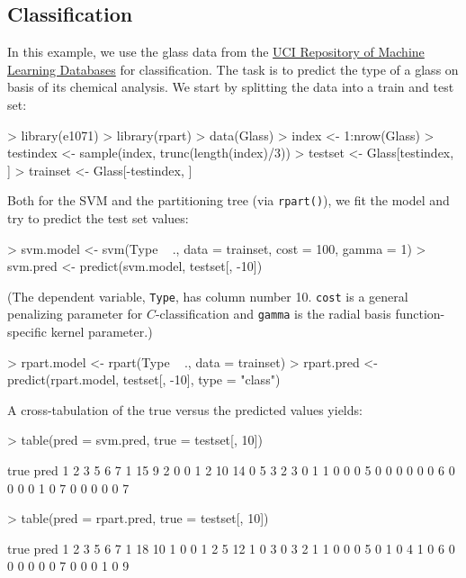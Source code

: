 \documentclass[a4paper]{article}
\begin{document}
\subsection*{Classification}

In this example, we use the glass data from the \href{http://www.ics.uci.edu/mlearn/MLRepository.html}{UCI Repository of
Machine Learning Databases} for
classification. The task is to predict the type of a glass on basis
of its chemical analysis.
We start by splitting the data into a train and test set:
\begin{Schunk}
\begin{Sinput}
> library(e1071)
> library(rpart)
> data(Glass)
> index <- 1:nrow(Glass)
> testindex <- sample(index, trunc(length(index)/3))
> testset <- Glass[testindex, ]
> trainset <- Glass[-testindex, ]
\end{Sinput}
\end{Schunk}
Both for the SVM and the partitioning tree (via
\texttt{rpart()}), we fit the model and try to predict the test set
values:
\begin{Schunk}
\begin{Sinput}
> svm.model <- svm(Type ~ ., data = trainset, cost = 100, gamma = 1)
> svm.pred <- predict(svm.model, testset[, -10])
\end{Sinput}
\end{Schunk}
(The dependent variable, \texttt{Type}, has column number
10. \texttt{cost} is a general penalizing parameter for $C$-classification and
\texttt{gamma} is the radial basis function-specific kernel parameter.)
\begin{Schunk}
\begin{Sinput}
> rpart.model <- rpart(Type ~ ., data = trainset)
> rpart.pred <- predict(rpart.model, testset[, -10], type = "class")
\end{Sinput}
\end{Schunk}
A cross-tabulation of the true versus the predicted values yields:
\begin{Schunk}
\begin{Sinput}
> table(pred = svm.pred, true = testset[, 10])
\end{Sinput}
\begin{Soutput}
    true
pred 1  2  3  5  6  7 
   1 15  9  2  0  0  1
   2 10 14  0  5  3  2
   3  0  1  1  0  0  0
   5  0  0  0  0  0  0
   6  0  0  0  0  1  0
   7  0  0  0  0  0  7
\end{Soutput}
\begin{Sinput}
> table(pred = rpart.pred, true = testset[, 10])
\end{Sinput}
\begin{Soutput}
    true
pred 1  2  3  5  6  7 
   1 18 10  1  0  0  1
   2  5 12  1  0  3  0
   3  2  1  1  0  0  0
   5  0  1  0  4  1  0
   6  0  0  0  0  0  0
   7  0  0  0  1  0  9
\end{Soutput}
\end{Schunk}
\end{document}
